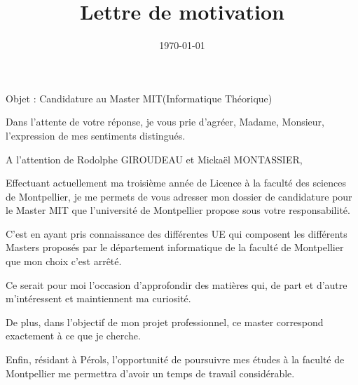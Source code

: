 \documentclass[11pt,a4paper,sans]{moderncv}        %
\title{Lettre de motivation}                               %
\begin{document}
\date{\today}
\opening{Objet : Candidature au Master MIT(Informatique Théorique)}
\closing{Dans l'attente de votre réponse, je vous prie d'agréer, Madame, Monsieur, l'expression de mes sentiments distingués.}
\makelettertitle

A l'attention de Rodolphe GIROUDEAU et Mickaël MONTASSIER,

Effectuant actuellement ma troisième année de Licence à la faculté des sciences de Montpellier, je me permets de vous adresser mon dossier de candidature pour le Master MIT que l’université de Montpellier propose sous votre responsabilité.

C'est en ayant pris connaissance des différentes UE qui composent les différents Masters proposés par le département informatique de la faculté de Montpellier que mon choix c'est arrêté. 

Ce serait pour moi l'occasion d'approfondir des matières qui, de part et d'autre m'intéressent et maintiennent ma curiosité. 

De plus, dans l'objectif de mon projet professionnel, ce master correspond exactement à ce que je cherche. 

Enfin, résidant à Pérols, l'opportunité de poursuivre mes études à la faculté  de Montpellier me permettra d'avoir un temps de travail considérable. 






\makeletterclosing
\end{document}
